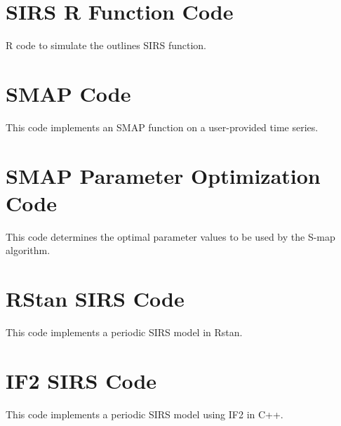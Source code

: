\documentclass[12pt]{article}
\begin{document}
\newpage
\begin{appendices}

	\section{SIRS R Function Code}

		R code to simulate the outlines SIRS function.

		

	\section{SMAP Code}

		This code implements an SMAP function on a user-provided time series.

		

	\section{SMAP Parameter Optimization Code}

		This code determines the optimal parameter values to be used by the S-map algorithm.

		

	\section{RStan SIRS Code}

	    This code implements a periodic SIRS model in Rstan.

	    

    \section{IF2 SIRS Code}

	    This code implements a periodic SIRS model using IF2 in C++.

	    

\end{appendices}
\end{document}
